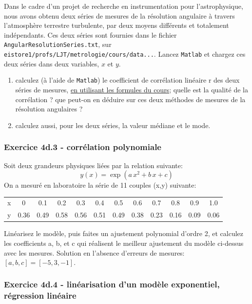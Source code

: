 \documentclass[main.tex]{subfiles}
\begin{document}
Dans le cadre d'un projet de recherche en instrumentation pour l'astrophysique, nous avons obtenu deux séries de mesures de la résolution angulaire à travers l'atmosphère terrestre turbulente, par deux moyens différents et totalement indépendants. Ces deux séries sont fournies dans le fichier \texttt{AngularResolutionSeries.txt}, sur \newline
\texttt{eistore1/profs/LJT/metrologie/cours/data...}. Lancez \texttt{Matlab} et chargez ces deux séries dans deux variables, $x$ et $y$.
\begin{enumerate}
    \item calculez (à l'aide de \texttt{Matlab}) le coefficient de corrélation linéaire r des deux séries de mesures, \underline{en utilisant les formules du cours}; quelle est la qualité de la corrélation ? que peut-on en déduire sur ces deux méthodes de mesures de la résolution angulaires ?
    \item calculez aussi, pour les deux séries, la valeur médiane et le mode.
\end{enumerate}

\subsubsection*{Exercice 4d.3 - corrélation polynomiale}

Soit deux grandeurs physiques liées par la relation suivante:
$$
    y(x)=\exp{(a\,x^2+b\,x+c)}
$$
On a mesuré en laboratoire la série de 11 couples (x,y) suivante:
\begin{center}
    \begin{tabular}{r|ccccccccccc}
        x & 0    & 0.1  & 0.2  & 0.3  & 0.4  & 0.5  & 0.6  & 0.7  & 0.8  & 0.9  & 1.0  \\
        y & 0.36 & 0.49 & 0.58 & 0.56 & 0.51 & 0.49 & 0.38 & 0.23 & 0.16 & 0.09 & 0.06
    \end{tabular}
\end{center}
Linéarisez le modèle, puis faites un ajustement polynomial d'ordre 2, et calculez les coefficients a, b, et c qui réalisent le meilleur ajustement du modèle ci-dessus avec les mesures. Solution en l'absence d'erreurs de mesures: $[a,b,c]=[-5,3,-1]$.

\subsubsection*{Exercice 4d.4 - linéarisation d'un modèle exponentiel, régression linéaire}
\end{document}
